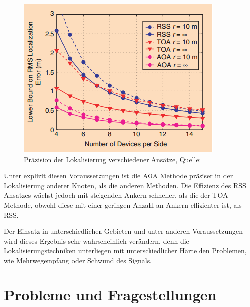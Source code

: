 \documentclass[12pt, a4wide]{scrreprt}
\begin{document}
\begin{figure}[!htb]
\centering
\includegraphics[scale=.6]{accuracy_patwari.png}
\caption{Präzision der Lokalisierung verschiedener Ansätze, Quelle:\cite{patwari_locating}}
\end{figure}

Unter explizit diesen Voraussetzungen\cite{patwari_locating} ist die AOA Methode präziser in der Lokalisierung anderer Knoten, als die anderen Methoden. Die Effizienz des RSS Ansatzes wächst jedoch mit steigenden Ankern schneller, als die der TOA Methode, obwohl diese mit einer geringen Anzahl an Ankern effizienter ist, als RSS.

Der Einsatz in unterschiedlichen Gebieten und unter anderen Voraussetzungen wird dieses Ergebnis sehr wahrscheinlich verändern, denn die Lokalisierungstechniken unterliegen mit unterschiedlicher Härte den Problemen, wie Mehrwegempfang oder Schwund des Signals. 

\chapter{Probleme und Fragestellungen}
\end{document}
